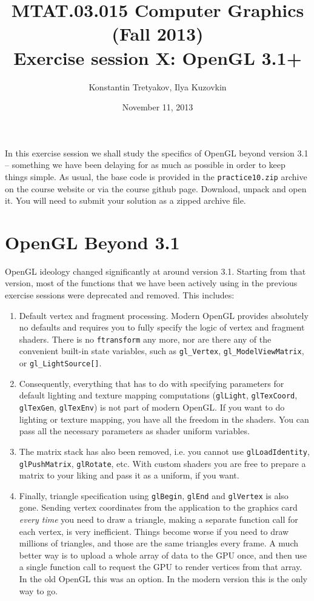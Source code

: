 \documentclass{article}
\begin{document}
\title{MTAT.03.015 Computer Graphics (Fall 2013)\\
Exercise session X: OpenGL 3.1+}
\author{Konstantin Tretyakov, Ilya Kuzovkin}
\date{November 11, 2013}
\maketitle

In this exercise session we shall study the specifics of OpenGL beyond version 3.1 -- something we have been delaying for as much as possible in order to keep things simple. As usual, the base code is provided in the \texttt{practice10.zip} archive on the course website or via the course github page. Download, unpack and open it. You will need to submit your solution as a zipped archive file.

\section{OpenGL Beyond 3.1}
OpenGL ideology changed significantly at around version 3.1. Starting from that version, most of the functions that we have been actively using in the previous exercise sessions were deprecated and removed. This includes:
\begin{enumerate}
\item Default vertex and fragment processing. Modern OpenGL provides absolutely no defaults and requires you to fully specify the logic of vertex and fragment shaders. There is no \texttt{ftransform} any more, nor are there any of the convenient built-in state variables, such as \verb#gl_Vertex#, \verb#gl_ModelViewMatrix#, or \verb#gl_LightSource[]#.
\item Consequently, everything that has to do with specifying parameters for default lighting and texture mapping computations (\texttt{glLight}, \texttt{glTexCoord}, \texttt{glTexGen}, \texttt{glTexEnv}) is not part of modern OpenGL. If you want to do lighting or texture mapping, you have all the freedom in the shaders. You can pass all the necessary parameters as shader uniform variables.
\item The matrix stack has also been removed, i.e. you cannot use \texttt{glLoadIdentity}, \texttt{glPushMatrix}, \texttt{glRotate}, etc. With custom shaders you are free to prepare a matrix to your liking and pass it as a uniform, if you want.
\item Finally, triangle specification using \texttt{glBegin}, \texttt{glEnd} and \texttt{glVertex} is also gone. Sending vertex coordinates from the application to the graphics card \emph{every time} you need to draw a triangle, making a separate function call for each vertex, is very inefficient. Things become worse if you need to draw millions of triangles, and those are the same triangles every frame. A much better way is to upload a whole array of data to the GPU once, and then use a single function call to request the GPU to render vertices from that array. In the old OpenGL this was an option. In the modern version this is the only way to go.
\end{enumerate}
\end{document}

